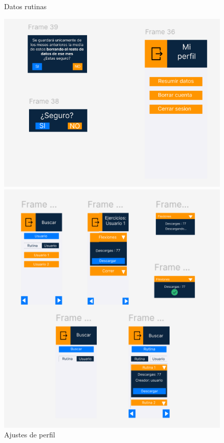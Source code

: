 \begin{figure}[H]
\begin{minipage}[b]{0.4\textwidth}
    \caption{Datos rutinas}
    \label{fig:Datos rutinas}
  \end{minipage}
  \begin{minipage}[b]{0.4\textwidth}
    \centering
    \includegraphics[width=\textwidth]{fotos/MiPerfil.png}
    \caption{Ajustes de perfil}
    \label{fig:Ajustes de perfil}
  \end{minipage}
  \begin{minipage}[b]{0.4\textwidth}
    \centering
    \includegraphics[width=\textwidth]{fotos/DescargarRutinas.png}

\end{minipage}
\end{figure}

